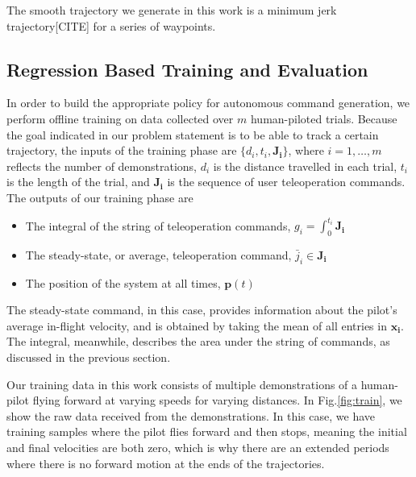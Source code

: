 \documentclass[letterpaper, 10 pt, conference]{ieeeconf}  %
\newcommand\NB[1]{$\spadesuit$\footnote{NB: #1}}
\begin{document}
The smooth trajectory we generate in this work is a minimum jerk trajectory[CITE] for a series of waypoints. 




\subsection{Regression Based Training and Evaluation} \label{sec:train}
In order to build the appropriate policy for autonomous command generation, we perform offline training on data collected over $m$ human-piloted trials. Because the goal indicated in our problem statement is to be able to track a certain trajectory, the inputs of the training phase are $\{d_i,t_i,\mathbf{J_i}\}$, where $i=1,\ldots,m$ reflects the number of demonstrations, %
$d_i$ is the distance travelled in each trial, $t_i$ is the length of the trial, and $\mathbf{J_i}$ is the sequence of user teleoperation commands. The outputs of our training phase are \begin{itemize}
    \item The integral of the string of teleoperation commands, $g_i = \int_0^{t_i}\mathbf{J_i}$
    \item The steady-state, or average, teleoperation command, $\bar{j}_i \in \mathbf{J_i}$
    \item The position of the system at all times, $\mathbf{p}(t)$
\end{itemize}
The steady-state command, in this case, provides information about the pilot's average in-flight velocity, and is obtained by taking the mean of all entries in $\mathbf{x_i}$. The integral, meanwhile, describes the area under the string of commands, as discussed in the previous section. %

Our training data in this work consists of multiple demonstrations of a human-pilot flying forward at varying speeds for varying distances. In Fig.\ref{fig:train}, we show the raw data received from the demonstrations. In this case, we have training samples where the pilot flies forward and then stops, meaning the initial and final velocities are both zero, which is why there are an extended periods where there is no forward motion at the ends of the trajectories.
\end{document}
